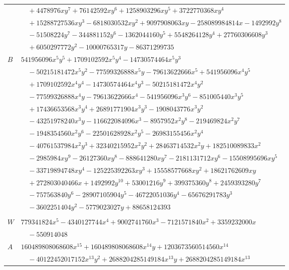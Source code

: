 \documentclass[11pt]{article}
\begin{document}
\begin{longtable}{@{}ll@{}}
 & $\quad +4478976xy^{7}+76142592xy^{6}+1258903296xy^{5}+3722770368xy^{4}$\\
 & $\quad +15288727536xy^{3}-6818030532xy^{2}+9097908063xy-258089984814x-1492992y^{8}$\\
 & $\quad -51508224y^{7}-344881152y^{6}-1362044160y^{5}+5548264128y^{4}+27760306608y^{3}$\\
 & $\quad +6050297772y^{2}-10000765317y-86371299735$\\
$B$ & $541956096x^{5}y^{5}+1709102592x^{5}y^{4}-14730574464x^{5}y^{3}$\\
 & $\quad -50215181472x^{5}y^{2}-77599326888x^{5}y-79613622666x^{5}+541956096x^{4}y^{5}$\\
 & $\quad +1709102592x^{4}y^{4}-14730574464x^{4}y^{3}-50215181472x^{4}y^{2}$\\
 & $\quad -77599326888x^{4}y-79613622666x^{4}-541956096x^{3}y^{6}-851005440x^{3}y^{5}$\\
 & $\quad +17436653568x^{3}y^{4}+26891771904x^{3}y^{3}-1908043776x^{3}y^{2}$\\
 & $\quad -43251978240x^{3}y-116622084096x^{3}-8957952x^{2}y^{8}-219469824x^{2}y^{7}$\\
 & $\quad -1948354560x^{2}y^{6}-22501628928x^{2}y^{5}-26983155456x^{2}y^{4}$\\
 & $\quad -40761537984x^{2}y^{3}+32340215952x^{2}y^{2}+28463714532x^{2}y+182510089833x^{2}$\\
 & $\quad -2985984xy^{9}-26127360xy^{8}-888641280xy^{7}-2181131712xy^{6}-15508995696xy^{5}$\\
 & $\quad -33719894748xy^{4}-125225392263xy^{3}+15558577668xy^{2}+18621762609xy$\\
 & $\quad +272803040466x+1492992y^{10}+53001216y^{9}+399375360y^{8}+2459393280y^{7}$\\
 & $\quad -757563840y^{6}-28907105904y^{5}-46722051036y^{4}-65676291783y^{3}$\\
 & $\quad -3602251404y^{2}-5779023027y+88658124393$\\
\addlinespace[3pt]
\multicolumn{2}{@{}l}{$i=35$, $m=4478976$, neighbours $114,4,11,18,57,64,69,88,100,104,105,106$}\\
$W$ & $779341824x^{5}-4340127744x^{4}+9002741760x^{3}-7121571840x^{2}+3359232000x$\\
 & $\quad -550914048$\\
$A$ & $160489808068608x^{15}+160489808068608x^{14}y+1203673560514560x^{14}$\\
 & $\quad -40122452017152x^{13}y^{2}+2688204285149184x^{13}y+2688204285149184x^{13}$\\

\end{longtable}
\end{document}
